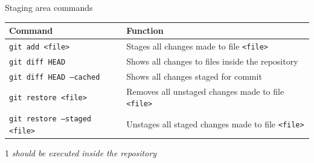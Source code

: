 \documentclass[10pt, graphics, aspectratio=169, table]{beamer}
\begin{document}
    \begin{frame}{Staging area commands}
        \begin{table}
            \centering
            \begin{threeparttable}
                \begin{tabular}{ll}
                    \toprule
                    Command & Function \\
                    \midrule
                    \texttt{git add <file>} & Stages all changes made to file \texttt{<file>}\tnote{1} \\
                    \texttt{git diff HEAD} & Shows all changes to files inside the repository\tnote{1} \\
                    \texttt{git diff HEAD --cached} & Shows all changes staged for commit\tnote{1} \\
                    \texttt{git restore <file>} & Removes all unstaged changes made to file \texttt{<file>}\tnote{1}\\
                    \texttt{git restore --staged <file>} & Unstages all staged changes made to file \texttt{<file>}\tnote{1}\\
                    \bottomrule
                \end{tabular}
                \begin{tablenotes}
                    \item [1]\emph{should be executed inside the repository}
                \end{tablenotes}
            \end{threeparttable}
        \end{table}
    \end{frame}
\end{document}
